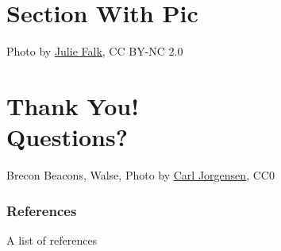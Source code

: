 \documentclass[aspectratio=169,11pt,hyperref={colorlinks=true}]{beamer}
\begin{document}
\section[Section With Pic]{Section With Pic}
\begin{sectionwithpicrx}{Photo by \href{https://www.flickr.com/photos/piper/}{\underline{Julie Falk}}, CC BY-NC 2.0}
\end{sectionwithpicrx}

\section[Q\&A]{Thank You! \\Questions?}

\begin{sectionwithpiclargecentral}{Brecon Beacons, Walse, Photo by \href{https://unsplash.com/@scamartist}{\underline{Carl Jorgensen}}, CC0}
\end{sectionwithpiclargecentral}

\begin{blackframe}
  \frametitle{References}
  A list of references
\end{blackframe}
\end{document}

